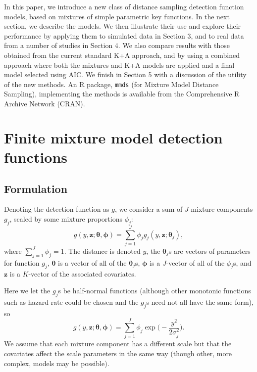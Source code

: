 \documentclass[useAMS,referee,usenatbib]{biom}
\begin{document}
In this paper, we introduce a new class of distance sampling detection function models, based on mixtures of simple parametric key functions.  In the next section, we describe the models.  We then illustrate their use and explore their performance by applying them to simulated data in Section 3, and to real data from a number of studies in Section 4. We also compare results with those obtained from the current standard K+A approach, and by using a combined approach where both the mixtures and K+A models are applied and a final model selected using AIC.  We finish in Section 5 with a discussion of the utility of the new methods.  An \textsf{R} \citep{Team:2013wf} package, \texttt{mmds} (for Mixture Model Distance Sampling), implementing the methods is available from the Comprehensive R Archive Network (CRAN).

\section{Finite mixture model detection functions}

\subsection{Formulation}
\label{s:detfcts}

Denoting the detection function as $g$, we consider a sum of $J$ mixture components $g_j$, scaled by some mixture proportions $\phi_j$:
\begin{equation*}
g(y,\mathbf{z}; \bm{\theta}, \bm{\phi}) = \sum_{j=1}^J \phi_j g_j(y,\mathbf{z}; \bm{\theta}_j),
\end{equation*}
where $\sum_{j=1}^J \phi_j = 1$. The distance is denoted $y$, the $\bm{\theta}_j$s are vectors of parameters for function $g_j$, $\bm{\theta}$ is a vector of all of the $\bm{\theta}_j$s, $\bm{\phi}$ is a $J$-vector of all of the $\phi_j$s, and $\mathbf{z}$ is a $K$-vector of the associated covariates.  

Here we let the $g_j$s be half-normal functions (although other monotonic functions such as hazard-rate could be chosen and the $g_j$s need not all have the same form), so
\begin{equation*}
g(y,\mathbf{z}; \bm{\theta}, \bm{\phi}) = \sum_{j=1}^J \phi_j \exp \Big( - \frac{y^2}{2\sigma_j^2} \Big).
\end{equation*}
We assume that each mixture component has a different scale but that the covariates affect the scale parameters in the same way (though other, more complex, models may be possible).
\end{document}

